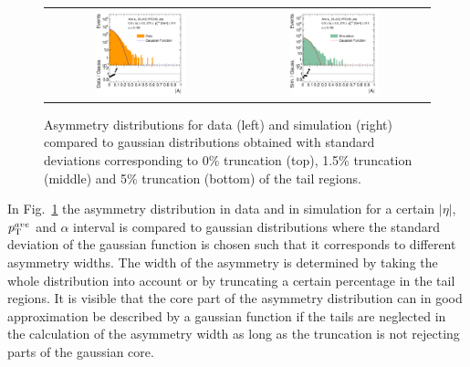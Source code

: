 \begin{figure}[!htp]
\begin{tabular}{cc}
                \includegraphics[width=0.49\textwidth]{figures/AsymmHistosDataWithRatio_Eta0_pt5_alpha2_final_nominal_95Truncation_v4.pdf} &
                \includegraphics[width=0.49\textwidth]{figures/AsymmHistosSimWithRatio_Eta0_pt5_alpha2_final_nominal_95Truncation_v4.pdf} \\
  \end{tabular}
  \caption{Asymmetry distributions for data (left) and simulation (right) compared to gaussian distributions obtained with standard deviations corresponding to 0\% truncation (top), 1.5\% truncation (middle) and 5\% truncation (bottom) of the tail regions.}
  \label{fig:asymm_width}
\end{figure}
In Fig.~\ref{fig:asymm_width} the asymmetry distribution in data and in simulation for a certain $|\eta|$, $p_{\text{T}}^{ave}$ and $\alpha$ interval is compared to gaussian distributions where the standard deviation of the gaussian function is chosen such that it corresponds to different asymmetry widths. The width of the asymmetry is determined by taking the whole distribution into account or by truncating a certain percentage in the tail regions. It is visible that the core part of the asymmetry distribution can in good approximation be described by a gaussian function if the tails are neglected in the calculation of the asymmetry width as long as the truncation is not rejecting parts of the gaussian core.\\
